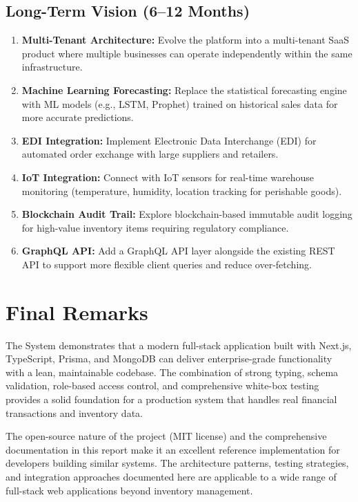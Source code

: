 \documentclass[12pt,a4paper]{report}
\begin{document}
\subsection{Long-Term Vision (6--12 Months)}

\begin{enumerate}[leftmargin=1.5em]
  \item \textbf{Multi-Tenant Architecture:} Evolve the platform into a multi-tenant SaaS product where multiple businesses can operate independently within the same infrastructure.
  \item \textbf{Machine Learning Forecasting:} Replace the statistical forecasting engine with ML models (e.g., LSTM, Prophet) trained on historical sales data for more accurate predictions.
  \item \textbf{EDI Integration:} Implement Electronic Data Interchange (EDI) for automated order exchange with large suppliers and retailers.
  \item \textbf{IoT Integration:} Connect with IoT sensors for real-time warehouse monitoring (temperature, humidity, location tracking for perishable goods).
  \item \textbf{Blockchain Audit Trail:} Explore blockchain-based immutable audit logging for high-value inventory items requiring regulatory compliance.
  \item \textbf{GraphQL API:} Add a GraphQL API layer alongside the existing REST API to support more flexible client queries and reduce over-fetching.
\end{enumerate}

\section{Final Remarks}

The System demonstrates that a modern full-stack application built with Next.js, TypeScript, Prisma, and MongoDB can deliver enterprise-grade functionality with a lean, maintainable codebase. The combination of strong typing, schema validation, role-based access control, and comprehensive white-box testing provides a solid foundation for a production system that handles real financial transactions and inventory data.

The open-source nature of the project (MIT license) and the comprehensive documentation in this report make it an excellent reference implementation for developers building similar systems. The architecture patterns, testing strategies, and integration approaches documented here are applicable to a wide range of full-stack web applications beyond inventory management.
\end{document}
